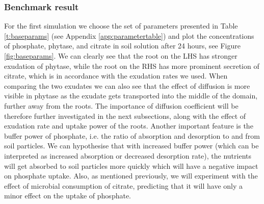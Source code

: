 \documentclass[11pt]{article}
\numberwithin{equation}{section}
\begin{document}
\subsubsection{Benchmark result}
\label{sec:baseparams}
 For the first simulation we choose the set of parameters presented in Table \ref{t:baseparams} (see Appendix \ref{app:parametertable}) and plot the concentrations of phosphate, phytase, and citrate in soil solution after 24 hours, see Figure \ref{fig:baseparams}. We can clearly see that the root on the LHS has stronger exudation of phytase, while the root on the RHS has more prominent secretion of citrate, which is in accordance with the exudation rates we used. When comparing the two exudates we can also see that the effect of diffusion is more visible in phytase as the exudate gets transported into the middle of the domain, further away from the roots. The importance of diffusion coefficient will be therefore further investigated in the next subsections, along with the effect of exudation rate and uptake power of the roots. Another important feature is the buffer power of phosphate, i.e. the ratio of absorption and desorption to and from soil particles. We can hypothesise that with increased buffer power (which can be interpreted as increased absorption or decreased desorption rate), the nutrients will get absorbed to soil particles more quickly which will have a negative impact on phosphate uptake. Also, as mentioned previously, we will experiment with the effect of microbial consumption of citrate, predicting that it will have only a minor effect on the uptake of phosphate.
\end{document}
